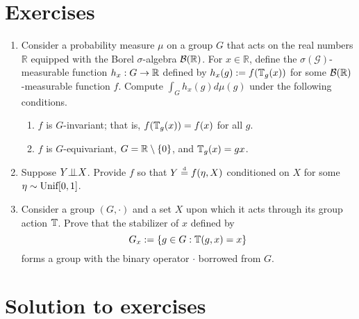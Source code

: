 

\section{Exercises}

\begin{enumerate}
	\item 
	Consider a probability measure $\mu$ on a group $G$ that acts on the real numbers $\mathbb{R}$ equipped with the Borel $\sigma$-algebra $\mathcal{B}(\mathbb{R})$.
	For $x \in \mathbb{R}$, define the $\sigma(\mathcal{G})$-measurable function $h_x: G \to \mathbb{R}$ defined by $h_x(g) := f(\mathbb{T}_g(x))$ for some $\mathcal{B}(\mathbb{R})$-measurable function $f$.
	Compute $\int_{G} h_x(g) d\mu(g)$ under the following conditions.
	\begin{enumerate}[label=(\alph*)]
		\item
		$f$ is $G$-invariant; that is, $f(\mathbb{T}_g(x)) = f(x)$ for all $g$.
		
		\item $f$ is $G$-equivariant, $G = \mathbb{R} \setminus \{0\}$, and $\mathbb{T}_g(x) = gx$.
	\end{enumerate}
	
	\item
	Suppose $Y {\perp\!\!\!\perp} X$.
	Provide $f$ so that $Y \stackrel{\text{\rm\tiny d}}{=} f(\eta,X)$ conditioned on $X$ for some $\eta \sim \text{\rm Unif}[0,1]$.
	
	\item Consider a group $(G, \cdot)$ and a set $X$ upon which it acts through its group action $\mathbb{T}$.
	Prove that the stabilizer of $x$ defined by
	$$
		G_x := \{ g \in G : \mathbb{T}(g,x) = x \}
	$$
	forms a group with the binary operator $\cdot$ borrowed from $G$.
\end{enumerate}

\pagebreak

\section{Solution to exercises}

